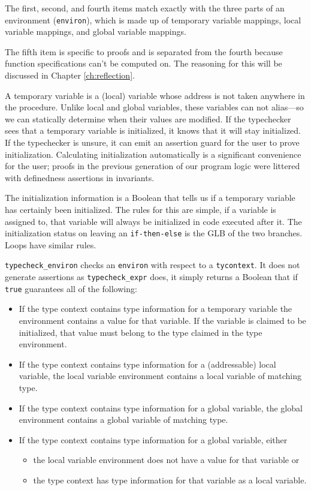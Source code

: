 \documentclass{puthesis}
\begin{document}
The first, second, and fourth items match exactly with the three parts of
an environment (\lstinline|environ|), which is made up of temporary variable
mappings, local variable mappings, and global variable mappings.

The fifth item is specific to proofs and is separated from the fourth
because function specifications can't be computed on. The reasoning
for this will be discussed in Chapter \ref{ch:reflection}. 

A temporary variable is a (local) variable whose address is not taken
anywhere in the procedure.  Unlike local and global variables,
these variables can not alias---so we can statically determine when their
values are modified. If the typechecker sees that a temporary variable
is initialized, it knows that it will stay initialized. If the
typechecker is unsure, it can emit an assertion guard for the user to
prove initialization. Calculating initialization automatically is a
significant convenience for the user; proofs in the previous
generation of our program logic were littered with definedness
assertions in invariants.

The initialization information is a Boolean that tells us if a
temporary variable has certainly been initialized. The rules for this
are simple, if a variable is assigned to, that variable will always be
initialized in code executed after it.  The initialization status on
leaving an \lstinline|if-then-else| is the GLB of the two
branches. Loops have similar rules.


\lstinline|typecheck_environ| checks an \lstinline|environ| with respect to
a \lstinline|tycontext|. 
It does not generate assertions as
\lstinline|typecheck_expr| does, it simply returns a Boolean
that if \lstinline{true} guarantees all of the following:
\begin{itemize}
  \item If the type context contains type information for a temporary variable
  the environment contains a value for that variable. If
  the variable is claimed to be initialized, that value
  must belong to the type claimed in the type environment.
  \item If the type context contains type information for a (addressable) local
  variable, the local variable environment contains a local variable of matching type.
  \item If the type context contains type information for a global variable, the
  global environment contains a global variable of matching type.
  \item If the type context contains type information for a global variable,
  either
     \begin{itemize}
       \item the local variable environment does not have a value for that
       variable or
       \item the type context has type information for that variable as a local
       variable.
       \end{itemize}
\end{itemize}
\end{document}
